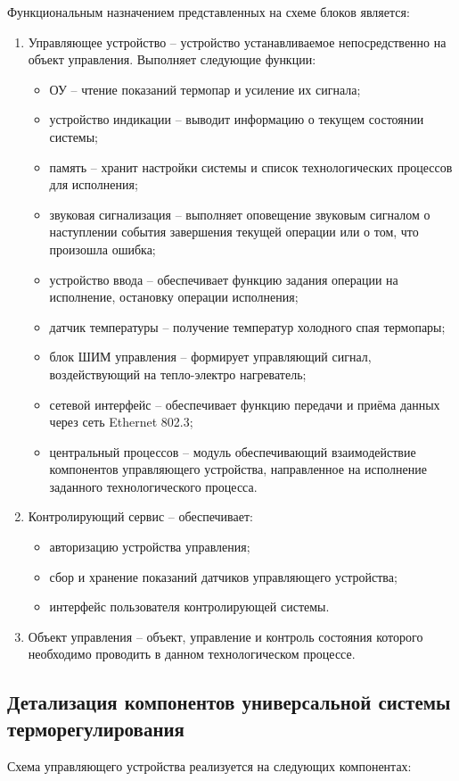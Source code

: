 Функциональным назначением представленных на схеме блоков является:
\begin{enumerate}
	\item{} Управляющее устройство -- устройство устанавливаемое непосредственно
	на объект управления. Выполняет следующие функции:
		\begin{itemize}
			\item{} ОУ -- чтение показаний термопар и усиление их сигнала;
			\item{} устройство индикации -- выводит информацию о текущем состоянии системы;
			\item{} память -- хранит настройки системы и список технологических процессов для
				исполнения;
			\item{} звуковая сигнализация -- выполняет оповещение звуковым сигналом о
				наступлении события завершения текущей операции или о том, что произошла ошибка;
			\item{} устройство ввода -- обеспечивает функцию задания операции на исполнение,
				остановку операции исполнения;
			\item{} датчик температуры -- получение температур холодного спая термопары;
			\item{} блок ШИМ управления -- формирует управляющий сигнал, воздействующий на
				тепло-электро нагреватель;
			\item{} сетевой интерфейс -- обеспечивает функцию передачи и приёма данных
				через сеть Ethernet 802.3;
			\item{} центральный процессов -- модуль обеспечивающий взаимодействие компонентов
				управляющего устройства, направленное на исполнение заданного технологического
				процесса.
		\end{itemize}
	\item{} Контролирующий сервис -- обеспечивает:
	 	\begin{itemize}
			\item{} авторизацию устройства управления;
			\item{} сбор и хранение показаний датчиков управляющего устройства;
			\item{} интерфейс пользователя контролирующей системы.
		\end{itemize}
	\item{} Объект управления -- объект, управление и контроль состояния которого необходимо проводить
		в данном технологическом процессе.
\end{enumerate}


\subsection{Детализация компонентов универсальной системы терморегулирования}
Схема управляющего устройства реализуется на следующих компонентах:

